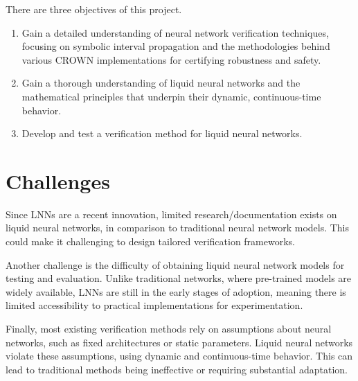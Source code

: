 There are three objectives of this project.

\begin{enumerate}
    \item 
    Gain a detailed understanding of neural network verification techniques, focusing on symbolic interval propagation and the methodologies behind various CROWN implementations for certifying robustness and safety.
    \item 
    Gain a thorough understanding of liquid neural networks and the mathematical principles that underpin their dynamic, continuous-time behavior.
    \item 
    Develop and test a verification method for liquid neural networks.
\end{enumerate}

\section{Challenges}

Since LNNs are a recent innovation, limited research/documentation exists on liquid neural networks, in comparison to traditional neural network models. This could make it challenging to design tailored verification frameworks.

Another challenge is the difficulty of obtaining liquid neural network models for testing and evaluation. Unlike traditional networks, where pre-trained models are widely available, LNNs are still in the early stages of adoption, meaning there is limited accessibility to practical implementations for experimentation.

Finally, most existing verification methods rely on assumptions about neural networks, such as fixed architectures or static parameters. Liquid neural networks violate these assumptions, using dynamic and continuous-time behavior. This can lead to traditional methods being ineffective or requiring substantial adaptation.